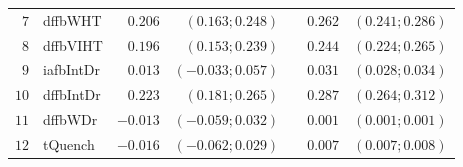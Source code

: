 \begin{table*}[htp]
\begin{tabular*}{\textwidth}{@{}rlrrrrr@{}}
\footnotesize{$7 $} & \footnotesize{dffbWHT  } & \footnotesize{$0.206$}   & \footnotesize{$(0.163;0.248)$}  && \footnotesize{$0.262$} & \footnotesize{$(0.241;0.286)$} \\
\footnotesize{$8 $} & \footnotesize{dffbVIHT } & \footnotesize{$0.196$}   & \footnotesize{$(0.153;0.239)$}  && \footnotesize{$0.244$} & \footnotesize{$(0.224;0.265)$} \\
\footnotesize{$9 $} & \footnotesize{iafbIntDr} & \footnotesize{$0.013$}   & \footnotesize{$(-0.033;0.057)$} && \footnotesize{$0.031$} & \footnotesize{$(0.028;0.034)$} \\
\footnotesize{$10$} & \footnotesize{dffbIntDr} & \footnotesize{$0.223$}   & \footnotesize{$(0.181;0.265)$}  && \footnotesize{$0.287$} & \footnotesize{$(0.264;0.312)$} \\
\footnotesize{$11$} & \footnotesize{dffbWDr  } & \footnotesize{$-0.013$}  & \footnotesize{$(-0.059;0.032)$} && \footnotesize{$0.001$} & \footnotesize{$(0.001;0.001)$} \\
\footnotesize{$12$} & \footnotesize{tQuench  } & \footnotesize{$-0.016$}  & \footnotesize{$(-0.062;0.029)$} && \footnotesize{$0.007$} & \footnotesize{$(0.007;0.008)$} \\

\bottomrule
\end{tabular*}
\end{table*}

